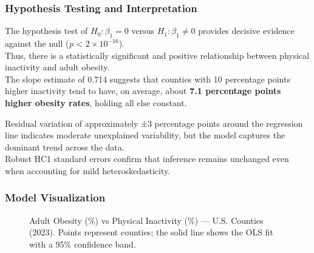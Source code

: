 \documentclass[
  letterpaper,
  DIV=11,
  numbers=noendperiod]{scrartcl}
\begin{document}
\subsubsection{Hypothesis Testing and
Interpretation}\label{hypothesis-testing-and-interpretation}

The hypothesis test of \(H_0: \beta_1 = 0\) versus
\(H_1: \beta_1 \neq 0\) provides decisive evidence against the null
(\emph{p} \textless{} \(2 \times 10^{-16}\)).\\
Thus, there is a statistically significant and positive relationship
between physical inactivity and adult obesity.\\
The slope estimate of 0.714 suggests that counties with 10 percentage
points higher inactivity tend to have, on average, about \textbf{7.1
percentage points higher obesity rates}, holding all else constant.

Residual variation of approximately ±3 percentage points around the
regression line indicates moderate unexplained variability, but the
model captures the dominant trend across the data.\\
Robust HC1 standard errors confirm that inference remains unchanged even
when accounting for mild heteroskedasticity.

\subsubsection{Model Visualization}\label{model-visualization}

\begin{figure}


\caption{\label{fig-county-scatter}Adult Obesity (\%) vs Physical
Inactivity (\%) --- U.S. Counties (2023). Points represent counties; the
solid line shows the OLS fit with a 95\% confidence band.}

\end{figure}%
\end{document}
